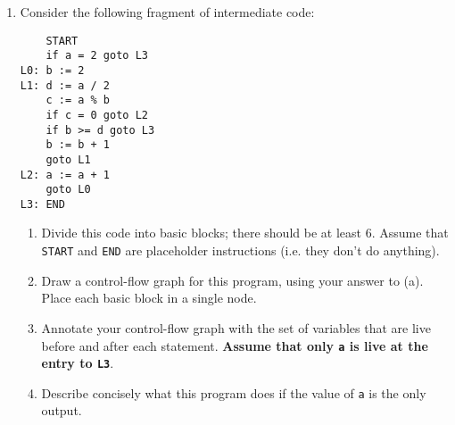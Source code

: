 \documentclass[12pt]{article} \usepackage{color} \usepackage{amsmath} \usepackage{amssymb}
\begin{document}
\begin{enumerate}
\newpage  

\item Consider the following fragment of intermediate code:
\begin{lstlisting}
    START
    if a = 2 goto L3
L0: b := 2
L1: d := a / 2
    c := a % b
    if c = 0 goto L2
    if b >= d goto L3
    b := b + 1
    goto L1
L2: a := a + 1
    goto L0
L3: END

\end{lstlisting}
\begin{enumerate}
\item Divide this code into basic blocks; there should be at least
6. Assume that \texttt{START} and \texttt{END} are placeholder
instructions (i.e. they don't do anything).
\item Draw a control-flow graph for this program, using your answer to
(a). Place each basic block in a single node.
\item Annotate your control-flow graph with the set of variables that
are live before and after each statement. {\bf Assume that only
\texttt{a} is live at the entry to \texttt{L3}}.
\item Describe concisely what this program does if the value of
  \texttt{a} is the only output.
 \end{enumerate}
\end{enumerate}
\end{document}
